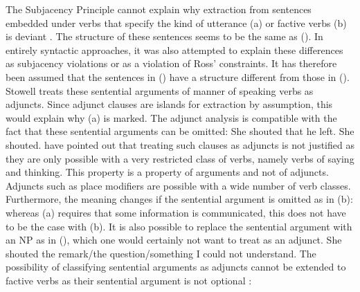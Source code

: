 The Subjacency Principle cannot explain why extraction from sentences embedded under verbs that specify the kind of utterance (a) or factive verbs (b)
is deviant \citep[--69]{EL79a}. 
\eal
{}
\zl
The structure of these sentences seems to be the same as (). In entirely syntactic approaches, it was also attempted to explain these differences as subjacency
violations or as a violation of Ross' constraints. It has therefore been assumed \citep[--402]{Stowell81a-u} that the sentences in () have a  structure different
from those in (). 
Stowell treats these sentential arguments of manner of speaking verbs as adjuncts. Since adjunct clauses are islands for extraction by assumption, this would explain why
(a) is marked. The adjunct analysis is compatible with the fact that these sentential arguments can be omitted:
\eal
\ex She shouted that he left.
\ex She shouted.
\zl
\citet[]{AG2008a} have pointed out that treating such clauses as adjuncts is not justified as they are only possible with a very restricted
class of verbs, namely verbs of saying and thinking. This property is a property of arguments and not of adjuncts.
Adjuncts such as place modifiers are possible with a wide number of verb classes. Furthermore, the meaning changes if the sentential argument is omitted as in (b):
whereas (a) requires that some information is communicated, this does not have to be the case with (b). It is also possible to replace the sentential argument
with an NP as in (), which one would certainly not want to treat as an adjunct.
\ea
She shouted the remark/the question/something I could not understand.
\z
The possibility of classifying sentential arguments as adjuncts cannot be extended to factive verbs
as their sentential argument is not optional \citep[]{AG2008a}:

\eal
{}
\zl

